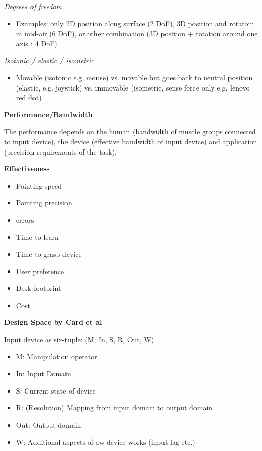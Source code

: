 \textit{Degrees of freedom} \smallskip

\begin{itemize}[itemsep=-5pt, topsep=0pt, leftmargin=*]
	\item Examples: only 2D position along surface (2 DoF), 3D position and rotatoin in mid-air (6 DoF), or other combination (3D position + rotation around one axis : 4 DoF)
\end{itemize} \medskip

\textit{Isotonic / elastic / isometric} \smallskip

\begin{itemize}[itemsep=-5pt, topsep=0pt, leftmargin=*]
	\item Movable (isotonic e.g. mouse) vs. movable but goes back to neutral position (elastic, e.g. joystick) vs. immovable (isometric, sense force only e.g. lenovo red dot)
\end{itemize} \medskip

\textbf{Performance/Bandwidth} \smallskip

The performance depends on the human (bandwidth of muscle groups connected to input device), the device (effective bandwidth of input device) 
and application (precision requirements of the task). \medskip

\textbf{Effectiveness} \smallskip

\begin{multicols}{2}
    \begin{itemize}[itemsep=-5pt, topsep=0pt, leftmargin=*]
	\item Pointing speed
	\item Pointing precision
	\item errors
	\item Time to learn
	\item Time to grasp device
	\item User preference
	\item Desk footprint
	\item Cost
	\end{itemize}
\end{multicols}


\textbf{Design Space by Card et al} \smallskip

Input device as six-tuple: (M, In, S, R, Out, W) \smallskip

\begin{multicols}{2}
    \begin{itemize}[itemsep=-5pt, topsep=0pt, leftmargin=*]
	\item M: Manipulation operator
	\item In: Input Domain
	\item S: Current state of device
	\item R: (Resolution) Mapping from input domain to output domain
	\item Out: Output domain
	\item W: Additional aspects of ow device works (input lag etc.)
	\end{itemize}
\end{multicols}


